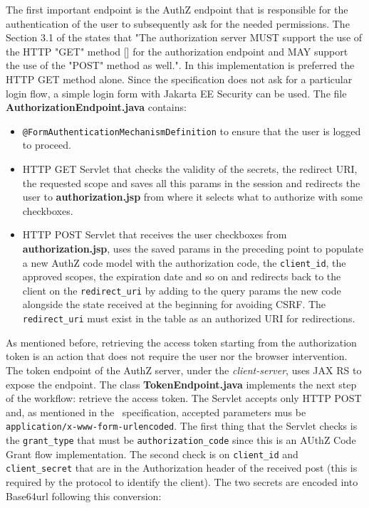 The first important endpoint is the AuthZ endpoint that is responsible for the authentication of the user to subsequently ask for the needed permissions. The Section 3.1 of the  states that "The authorization server MUST support the use of the HTTP "GET" method [] for the authorization endpoint and MAY support the use of the "POST" method as well.". In this implementation is preferred the HTTP GET method alone. Since the specification does not ask for a particular login flow, a simple login form with Jakarta EE Security can be used. The file \textbf{AuthorizationEndpoint.java} contains:

\begin{itemize}
    \item \texttt{@FormAuthenticationMechanismDefinition} to ensure that the user is logged to proceed.
    \item HTTP GET Servlet that checks the validity of the secrets, the redirect URI, the requested scope and saves all this params in the session and redirects the user to \textbf{authorization.jsp} from where it selects what to authorize with some checkboxes.
    \item HTTP POST Servlet that receives the user checkboxes from \textbf{authorization.jsp}, uses the saved params in the preceding point to populate a new AuthZ code model with the authorization code, the \texttt{client\_id}, the approved scopes, the expiration date and so on and redirects back to the client on the \texttt{redirect\_uri} by adding to the query params the new code alongside the state received at the beginning for avoiding CSRF. The \texttt{redirect\_uri} must exist in the table as an authorized URI for redirections.
\end{itemize}

\noindent As mentioned before, retrieving the access token starting from the authorization token is an action that does not require the user nor the browser intervention. The token endpoint of the AuthZ server, under the \textit{client-server}, uses JAX RS to expose the endpoint. The class \textbf{TokenEndpoint.java} implements the next step of the workflow: retrieve the access token. The Servlet accepts only HTTP POST and, as mentioned in the \oauth\ specification, accepted parameters mus be \texttt{application/x-www-form-urlencoded}. The first thing that the Servlet checks is the \texttt{grant\_type} that must be \texttt{authorization\_code} since this is an AUthZ Code Grant flow implementation. The second check is on \texttt{client\_id} and \texttt{client\_secret} that are in the Authorization header of the received post (this is required by the protocol to identify the client). The two secrets are encoded into Base64url following this conversion:

